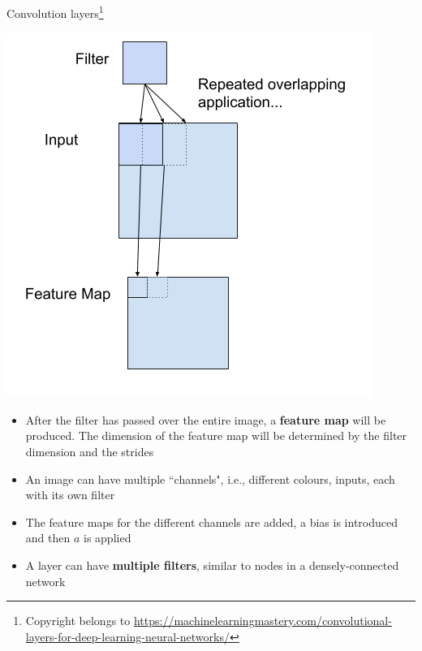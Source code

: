 \documentclass{beamer}
\begin{document}
\begin{frame}{Convolution layers\footnote{Copyright belongs to \url{https://machinelearningmastery.com/convolutional-layers-for-deep-learning-neural-networks/}}}
\begin{minipage}{0.39\linewidth}
\includegraphics[width=\textwidth]{Images/cfilter.png}
\end{minipage}
\begin{minipage}{0.59\linewidth}
\begin{itemize}
\item After the filter has passed over the entire image, a \textbf{feature map} will be produced. The dimension of the feature map will be determined by the filter dimension and the strides
\item An image can have multiple ``channels", i.e., different colours, inputs, each with its own filter
\item The feature maps for the different channels are added, a bias is introduced and then $a$ is applied 
\item A layer can have \textbf{multiple filters}, similar to nodes in a densely-connected network
\end{itemize}
\end{minipage}
\end{frame}
\end{document}
